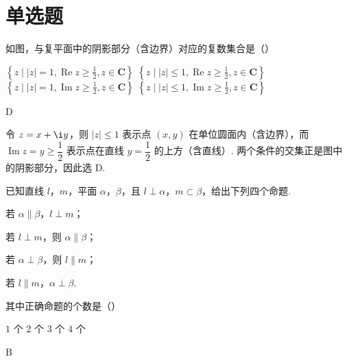 \section{单选题}
\begin{problem}
如图，与复平面中的阴影部分（含边界）对应的复数集合是（\quad）


\choices
    {\(\left\{z\mid |z| = 1,\operatorname{Re} z \geqslant \frac{1}{2}, z \in \mathbf{C}\right\}\)}
    {\(\left\{z\mid |z| \leqslant 1,\operatorname{Re} z \geqslant \frac{1}{2}, z \in \mathbf{C}\right\}\)}
    {\(\left\{z\mid |z| = 1,\operatorname{Im} z \geqslant \frac{1}{2}, z \in \mathbf{C}\right\}\)}
    {\(\left\{z\mid |z| \leqslant 1,\operatorname{Im} z \geqslant \frac{1}{2}, z \in \mathbf{C}\right\}\)}
\end{problem}

\begin{answer}
D
\end{answer}

\begin{solution}
令 \(z=x+\i y\)，则 \(|z|\leqslant1\) 表示点 \((x,y)\) 在单位圆面内（含边界），而 \(\operatorname{Im}z=y\geqslant\dfrac{1}{2}\) 表示点在直线 \(y=\dfrac{1}{2}\) 的上方（含直线）. 两个条件的交集正是图中的阴影部分，因此选 D.
\end{solution}

\begin{problem}
已知直线 \(l\)，\(m\)，平面 \(\alpha\)，\(\beta\)，且 \(l \perp \alpha\)，\(m \subset \beta\)，给出下列四个命题.

\begin{circlelist}
\item 若 \(\alpha \parallel \beta\)，\(l \perp m\)；
\item 若 \(l \perp m\)，则 \(\alpha \parallel \beta\)；
\item 若 \(\alpha \perp \beta\)，则 \(l \parallel m\)；
\item 若 \(l \parallel m\)，\(\alpha \perp \beta\).
\end{circlelist}

其中正确命题的个数是（\quad）

\choices
    {\(1\) 个}
    {\(2\) 个}
    {\(3\) 个}
    {\(4\) 个}
\end{problem}

\begin{answer}
B
\end{answer}

